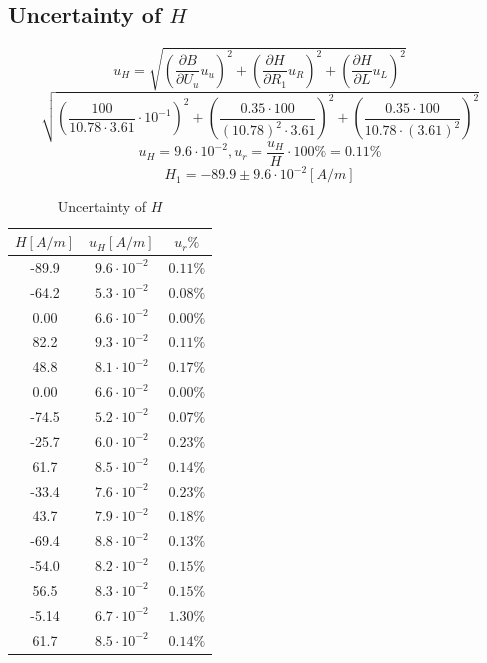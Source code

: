 \documentclass[12pt]{article}
\begin{document}
\subsection{Uncertainty of $H$}
$$u_H=\sqrt{(\frac{\partial B}{\partial U_u}u_u)^2+(\frac{\partial H}{\partial R_1}u_R)^2+(\frac{\partial H}{\partial L}u_L)^2}$$
$$\sqrt{(\frac{100}{10.78\cdot3.61}\cdot10^{-1})^2+(\frac{0.35\cdot100}{(10.78)^2\cdot3.61})^2+(\frac{0.35\cdot100}{10.78\cdot(3.61)^2})^2}$$
$$u_H=9.6\cdot10^{-2},u_r=\frac{u_H}{H}\cdot100\%=0.11\%$$
$$H_1=-89.9\pm9.6\cdot10^{-2}[A/m]$$
\begin{table}[H]
\centering
\begin{tabular}{|c|c|c|}
\hline
$H[A/m]$ & $u_H[A/m]$ &$u_r\%$  \\ \hline
-89.9&$9.6\cdot10^{-2}$  &$0.11\%$  \\ \hline
-64.2 &$5.3\cdot10^{-2}$  &$0.08\%$  \\ \hline
0.00 &$6.6\cdot10^{-2}$  &$0.00\%$    \\ \hline
82.2 &$9.3\cdot10^{-2}$  &$0.11\%$    \\ \hline
48.8 &$8.1\cdot10^{-2}$  &$0.17\%$  \\ \hline
0.00 &$6.6\cdot10^{-2}$  &$0.00\%$    \\ \hline
-74.5&$5.2\cdot10^{-2}$  &$0.07\%$    \\ \hline
-25.7&$6.0\cdot10^{-2}$  &$0.23\%$    \\ \hline
61.7&$8.5\cdot10^{-2}$  &$0.14\%$    \\ \hline
-33.4&$7.6\cdot10^{-2}$  &$0.23\%$    \\ \hline
43.7&$7.9\cdot10^{-2}$  &$0.18\%$    \\ \hline
-69.4&$8.8\cdot10^{-2}$  &$0.13\%$    \\ \hline
-54.0&$8.2\cdot10^{-2}$  &$0.15\%$    \\ \hline
56.5&$8.3\cdot10^{-2}$  &$0.15\%$    \\ \hline
-5.14 &$6.7\cdot10^{-2}$  &$1.30\%$    \\ \hline
61.7 &$8.5\cdot10^{-2}$  &$0.14\%$    \\ \hline
\end{tabular}
\caption{Uncertainty of $H$}
\end{table}
\end{document}
